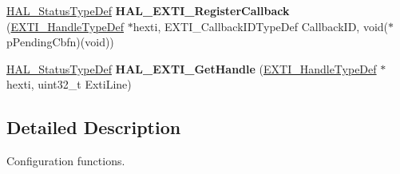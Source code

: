 \begin{DoxyCompactItemize}
\hyperlink{stm32f4xx__hal__def_8h_a63c0679d1cb8b8c684fbb0632743478f}{H\+A\+L\+\_\+\+Status\+Type\+Def} {\bfseries H\+A\+L\+\_\+\+E\+X\+T\+I\+\_\+\+Register\+Callback} (\hyperlink{struct_e_x_t_i___handle_type_def}{E\+X\+T\+I\+\_\+\+Handle\+Type\+Def} $\ast$hexti, E\+X\+T\+I\+\_\+\+Callback\+I\+D\+Type\+Def Callback\+ID, void($\ast$p\+Pending\+Cbfn)(void))
\item 
\mbox{\label{group___e_x_t_i___exported___functions___group1_gaa5856ee92dc1265db144af025673ee46}} 
\hyperlink{stm32f4xx__hal__def_8h_a63c0679d1cb8b8c684fbb0632743478f}{H\+A\+L\+\_\+\+Status\+Type\+Def} {\bfseries H\+A\+L\+\_\+\+E\+X\+T\+I\+\_\+\+Get\+Handle} (\hyperlink{struct_e_x_t_i___handle_type_def}{E\+X\+T\+I\+\_\+\+Handle\+Type\+Def} $\ast$hexti, uint32\+\_\+t Exti\+Line)
\end{DoxyCompactItemize}


\subsection{Detailed Description}
Configuration functions. 

